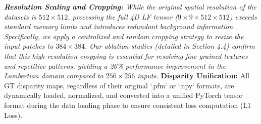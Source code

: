\textit{   \textbf{Resolution Scaling and Cropping:} While the original spatial resolution of the datasets is $512 \times 512$, processing the full 4D LF tensor ($9 \times 9 \times 512 \times 512$) exceeds standard memory limits and introduces redundant background information. Specifically, we apply a centralized and random cropping strategy to resize the input patches to $384 \times 384$. Our ablation studies (detailed in Section 4.4) confirm that this high-resolution cropping is essential for resolving fine-grained textures and repetitive patterns, yielding a 26\% performance improvement in the Lambertian domain compared to $256 \times 256$ inputs.
}   \textbf{Disparity Unification:} All GT disparity maps, regardless of their original `.pfm` or `.npy` formats, are dynamically loaded, normalized, and converted into a unified PyTorch tensor format during the data loading phase to ensure consistent loss computation (L1 Loss).
